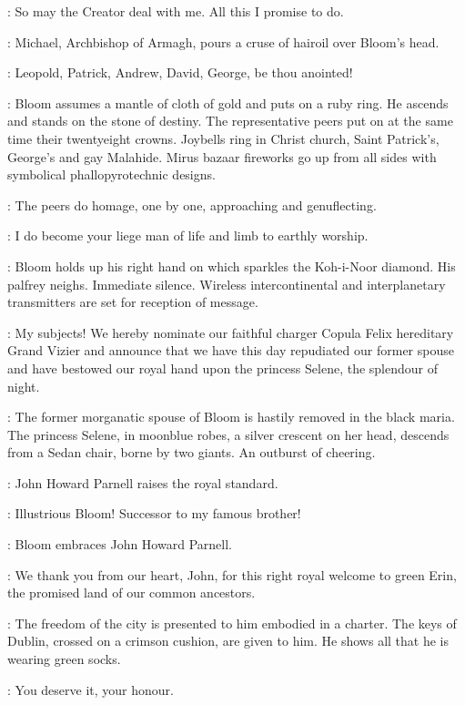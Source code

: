 \Bloom:
So may the Creator deal with me.
All this I promise to do.

:
Michael, Archbishop of Armagh, pours a cruse of hairoil over Bloom's head.

\MikeArmagh:
Leopold, Patrick, Andrew, David, George, be thou anointed!

:
Bloom assumes a mantle of cloth of gold and puts on a ruby ring.
He ascends and stands on the stone of destiny.
The representative peers put on at the same time their twentyeight crowns.
Joybells ring in Christ church, Saint Patrick's, George's and gay Malahide.
Mirus bazaar fireworks go up from all sides with symbolical phallopyrotechnic designs.

:
The peers do homage, one by one, approaching and genuflecting.

\Peers:
I do become your liege man of life and limb to earthly worship.

:
Bloom holds up his right hand on which sparkles the Koh-i-Noor diamond.
His palfrey neighs.
Immediate silence.
Wireless intercontinental and interplanetary transmitters are set for reception of message.

\Bloom:
My subjects!
We hereby nominate our faithful charger Copula Felix hereditary Grand Vizier
and announce that we have this day repudiated our former spouse
and have bestowed our royal hand upon the princess Selene,
the splendour of night.

:
The former morganatic spouse of Bloom is hastily removed in the black maria.
The princess Selene, in moonblue robes, a silver crescent on her head,
descends from a Sedan chair, borne by two giants.
An outburst of cheering.

:
John Howard Parnell raises the royal standard.

\Parnell:
Illustrious Bloom!
Successor to my famous brother!

:
Bloom embraces John Howard Parnell.

\Bloom:
We thank you from our heart, John,
for this right royal welcome to green Erin,
the promised land of our common ancestors.

:
The freedom of the city is presented to him embodied in a charter.
The keys of Dublin, crossed on a crimson cushion, are given to him.%
He shows all that he is wearing green socks.

\Kernan[2]:
You deserve it, your honour.

